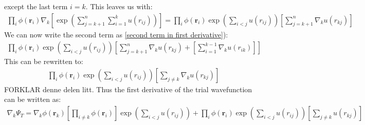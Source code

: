 \documentclass[a4paper, 10pt]{article}
\begin{document}
\begin{appendices}
		except the last term $i = k$. This leaves us with:
		\begin{align}
		\prod_{i}\phi(\boldsymbol{r}_{i})\nabla_{k}\left[\exp\left(\sum_{j = k+1}^{n}\sum_{i = 1}^{k}u(r_{ij})\right)\right]
		= \prod_{i}\phi(\boldsymbol{r}_{i})
		\exp{\left(\sum_{i<j}u(r_{ij})\right)}
		\left[\sum_{j = k + 1}^{n}\nabla_{k}u(r_{kj})\right]
		\end{align}
		We can now write the second term as \ref{second term in first derivative}):
		\begin{align}\label{combined sum}
		\prod_{i}\phi(\boldsymbol{r}_{i})
		\exp{\left(\sum_{i<j}u(r_{ij})\right)}
		\left[\sum_{j = k + 1}^{n}\nabla_{k}u(r_{kj}) +
		\left[\sum_{i = 1}^{k-1}\nabla_{k}u(r_{ik})\right]\right]
		\end{align}
		This can be rewritten to:
		\begin{align}
		\prod_{i}\phi(\boldsymbol{r}_{i})
		\exp{\left(\sum_{i<j}u(r_{ij})\right)}
		\left[\sum_{j \neq k}\nabla_{k}u(r_{kj})\right]
		\end{align}
		FORKLAR denne delen litt. Thus the first derivative of the trial wavefunction
		can be written as:
		\begin{align}
		\nabla_{k}\Psi_{T} =
		\nabla_k \phi(\mathbf{r}_k)\left[ \prod_{i\neq k} \phi(\mathbf{r}_i)\right]\exp\left(\sum_{i<j}u(r_{ij})\right)
		+ \prod_{i}\phi(\boldsymbol{r}_{i})
		\exp{\left(\sum_{i<j}u(r_{ij})\right)}
		\left[\sum_{j \neq k}u(r_{kj})\right]
		\end{align}

\end{appendices}
\end{document}
